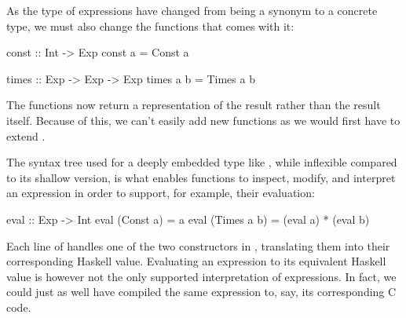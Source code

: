 \documentclass[../main.tex]{subfiles}
\begin{document}
As the type of expressions have changed from being a synonym to a concrete type, we must also change the functions that comes with it:


\begin{code}
const :: Int -> Exp
const a = Const a

times :: Exp -> Exp -> Exp
times a b = Times a b
\end{code}

\noindent The functions now return a representation of the result rather than the result itself. Because of this, we can't easily add new functions as we would first have to extend .

The syntax tree used for a deeply embedded type like , while inflexible compared to its shallow version, is what enables functions to inspect, modify, and interpret an expression in order to support, for example, their evaluation:

\begin{code}
eval :: Exp -> Int
eval (Const a)   = a
eval (Times a b) = (eval a) * (eval b)
\end{code}

\noindent Each line of  handles one of the two constructors in , translating them into their corresponding Haskell value. Evaluating an expression to its equivalent Haskell value is however not the only supported interpretation of expressions. In fact, we could just as well have compiled the same expression to, say, its corresponding C code.



\end{document}
